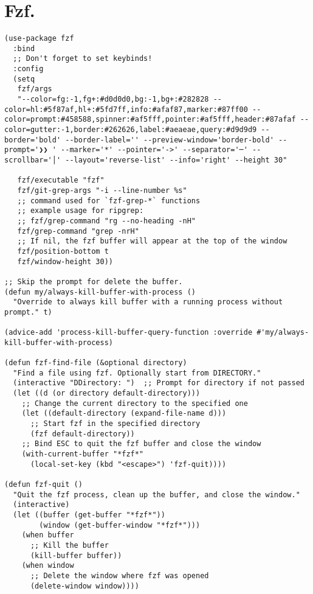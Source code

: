 \documentclass[11pt]{article}
\begin{document}
\section{Fzf.}
\label{sec:org4a7eeaf}
\begin{verbatim}
(use-package fzf
  :bind
  ;; Don't forget to set keybinds!
  :config
  (setq
   fzf/args
   "--color=fg:-1,fg+:#d0d0d0,bg:-1,bg+:#282828 --color=hl:#5f87af,hl+:#5fd7ff,info:#afaf87,marker:#87ff00 --color=prompt:#458588,spinner:#af5fff,pointer:#af5fff,header:#87afaf --color=gutter:-1,border:#262626,label:#aeaeae,query:#d9d9d9 --border='bold' --border-label='' --preview-window='border-bold' --prompt='❯❯ ' --marker='*' --pointer='->' --separator='─' --scrollbar='│' --layout='reverse-list' --info='right' --height 30"

   fzf/executable "fzf"
   fzf/git-grep-args "-i --line-number %s"
   ;; command used for `fzf-grep-*` functions
   ;; example usage for ripgrep:
   ;; fzf/grep-command "rg --no-heading -nH"
   fzf/grep-command "grep -nrH"
   ;; If nil, the fzf buffer will appear at the top of the window
   fzf/position-bottom t
   fzf/window-height 30))

;; Skip the prompt for delete the buffer.
(defun my/always-kill-buffer-with-process ()
  "Override to always kill buffer with a running process without prompt." t)

(advice-add 'process-kill-buffer-query-function :override #'my/always-kill-buffer-with-process)

(defun fzf-find-file (&optional directory)
  "Find a file using fzf. Optionally start from DIRECTORY."
  (interactive "DDirectory: ")  ;; Prompt for directory if not passed
  (let ((d (or directory default-directory)))
    ;; Change the current directory to the specified one
    (let ((default-directory (expand-file-name d)))
      ;; Start fzf in the specified directory
      (fzf default-directory))
    ;; Bind ESC to quit the fzf buffer and close the window
    (with-current-buffer "*fzf*"
      (local-set-key (kbd "<escape>") 'fzf-quit))))

(defun fzf-quit ()
  "Quit the fzf process, clean up the buffer, and close the window."
  (interactive)
  (let ((buffer (get-buffer "*fzf*"))
        (window (get-buffer-window "*fzf*")))
    (when buffer
      ;; Kill the buffer
      (kill-buffer buffer))
    (when window
      ;; Delete the window where fzf was opened
      (delete-window window))))
\end{verbatim}
\end{document}
